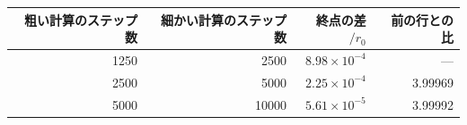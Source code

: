 \begin{tabular}{rrrr}\toprule
粗い計算のステップ数 & 細かい計算のステップ数 & 終点の差$/r_0$ & 前の行との比 \\
\midrule
1250 & 2500 & $8.98\times 10^{-4}$ & --- \\
2500 & 5000 & $2.25\times 10^{-4}$ & 3.99969 \\
5000 & 10000 & $5.61\times 10^{-5}$ & 3.99992 \\
\bottomrule\end{tabular}
